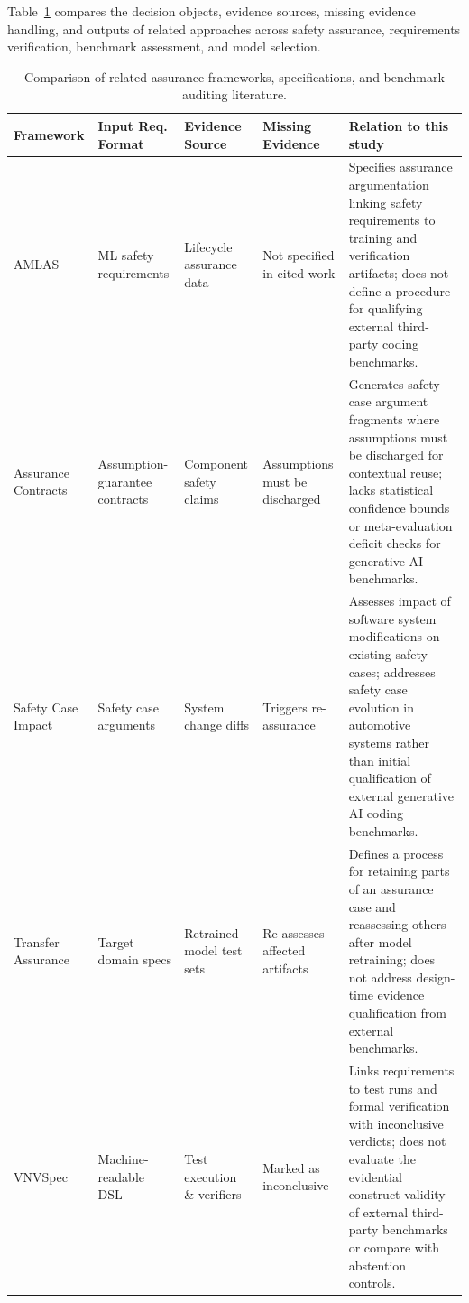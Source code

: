 \documentclass[runningheads]{llncs}
\begin{document}
Table~\ref{tab:paper2_related_work} compares the decision objects, evidence sources, missing evidence handling, and outputs of related approaches across safety assurance, requirements verification, benchmark assessment, and model selection.

\begin{table}[t]
\caption{Comparison of related assurance frameworks, specifications, and benchmark auditing literature.}
\label{tab:paper2_related_work}
\centering
\scriptsize
\setlength{\tabcolsep}{3pt}
\begin{tabularx}{\textwidth}{@{}l>{\raggedright\arraybackslash}p{2.2cm}>{\raggedright\arraybackslash}p{2.3cm}>{\raggedright\arraybackslash}p{2.3cm}>{\raggedright\arraybackslash}X@{}}
\toprule
\textbf{Framework} & \textbf{Input Req. Format} & \textbf{Evidence Source} & \textbf{Missing Evidence} & \textbf{Relation to this study} \\
\midrule
AMLAS \cite{hawkins_amlas_2021} & ML safety requirements & Lifecycle assurance data & Not specified in cited work & Specifies assurance argumentation linking safety requirements to training and verification artifacts; does not define a procedure for qualifying external third-party coding benchmarks. \\
Assurance Contracts \cite{sljivo_assurance_contracts_2014} & Assumption-guarantee contracts & Component safety claims & Assumptions must be discharged & Generates safety case argument fragments where assumptions must be discharged for contextual reuse; lacks statistical confidence bounds or meta-evaluation deficit checks for generative AI benchmarks. \\
Safety Case Impact \cite{lawford_safety_case_impact_2017} & Safety case arguments & System change diffs & Triggers re-assurance & Assesses impact of software system modifications on existing safety cases; addresses safety case evolution in automotive systems rather than initial qualification of external generative AI coding benchmarks. \\
Transfer Assurance \cite{picardi_transfer_assurance_2023} & Target domain specs & Retrained model test sets & Re-assesses affected artifacts & Defines a process for retaining parts of an assurance case and reassessing others after model retraining; does not address design-time evidence qualification from external benchmarks. \\
VNVSpec \cite{arief_vnvspec_2026} & Machine-readable DSL & Test execution \& verifiers & Marked as inconclusive & Links requirements to test runs and formal verification with inconclusive verdicts; does not evaluate the evidential construct validity of external third-party benchmarks or compare with abstention controls. \\

\end{tabularx}
\end{table}
\end{document}

